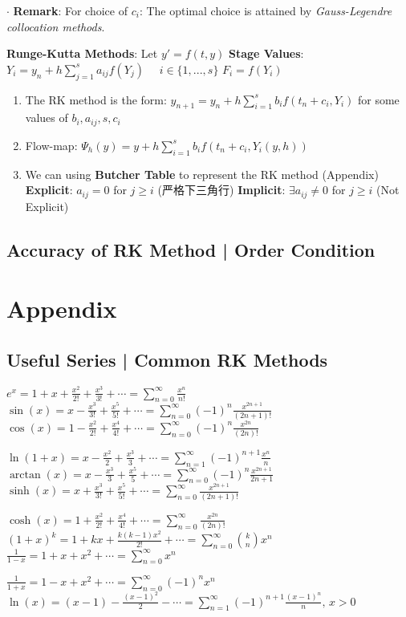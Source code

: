 \documentclass[9pt]{article}
\begin{document}
$\cdot$ \textbf{Remark}: {\footnotesize For choice of $c_i$: The optimal choice is attained by \textit{Gauss-Legendre collocation methods}}.

\textbf{Runge-Kutta Methods}: Let $y'=f(t,y)$ \quad \textbf{Stage Values}: $Y_i=y_n+h\sum_{j=1}^{s}a_{ij}f(Y_{j})$ \ \ $i\in\{1,...,s\}$ \quad $F_i=f(Y_i)$

\begin{enumerate}[itemsep=-2pt, topsep=-2pt]
    \item The RK method is the form: $y_{n+1}=y_n+h\sum_{i=1}^{s}b_if(t_n+c_i,Y_i)$ \quad for some values of $b_i,a_{ij},s,c_i$ 
    \item Flow-map: $\Psi_{h}(y)=y+h\sum_{i=1}^{s}b_if(t_n+c_i,Y_{i}(y,h))$ \quad \quad {}
    \item \small{{\scriptsize We can using \textbf{Butcher Table} to represent the RK method (Appendix)} \quad \textbf{Explicit}: $a_{ij}=0$ for $j\geq i$ {\scriptsize (严格下三角行)} \quad \textbf{Implicit}: $\exists a_{ij}\ne0$ for $j\geq i$ {\scriptsize (Not Explicit)}}
\end{enumerate}


\subsection{Accuracy of RK Method | Order Condition} %



\section{Appendix} 

\subsection{Useful Series | Common RK Methods} %
\small{
$e^x = 1 + x + \frac{x^2}{2!} + \frac{x^3}{3!} + \cdots  = \sum_{n=0}^\infty \frac{x^n}{n!}$ \quad $ \sin(x) = x - \frac{x^3}{3!} + \frac{x^5}{5!} + \cdots = \sum_{n=0}^\infty (-1)^n \frac{x^{2n+1}}{(2n+1)!} $ \quad $\cos(x) = 1 - \frac{x^2}{2!} + \frac{x^4}{4!} + \cdots = \sum_{n=0}^\infty (-1)^n \frac{x^{2n}}{(2n)!}$

$\ln(1+x) = x - \frac{x^2}{2} + \frac{x^3}{3}  + \cdots = \sum_{n=1}^\infty (-1)^{n+1} \frac{x^n}{n}$ \quad $\arctan(x) = x - \frac{x^3}{3} + \frac{x^5}{5} + \cdots = \sum_{n=0}^\infty (-1)^n \frac{x^{2n+1}}{2n+1}$ \quad $\sinh(x) = x + \frac{x^3}{3!} + \frac{x^5}{5!} + \cdots = \sum_{n=0}^\infty \frac{x^{2n+1}}{(2n+1)!}$

$\cosh(x) = 1 + \frac{x^2}{2!} + \frac{x^4}{4!} + \cdots = \sum_{n=0}^\infty \frac{x^{2n}}{(2n)!}$  \quad $(1+x)^k = 1 + kx + \frac{k(k-1)x^2}{2!} + \cdots = \sum_{n=0}^\infty \binom{k}{n} x^n$ $\frac{1}{1-x} = 1 + x + x^2  + \cdots = \sum_{n=0}^\infty x^n $ 

$\frac{1}{1+x} = 1 - x + x^2  + \cdots = \sum_{n=0}^\infty (-1)^n x^n$ \quad $\ln(x) = (x-1) - \frac{(x-1)^2}{2} - \cdots = \sum_{n=1}^\infty (-1)^{n+1} \frac{(x-1)^n}{n}, \, x > 0$
}
\end{document}
